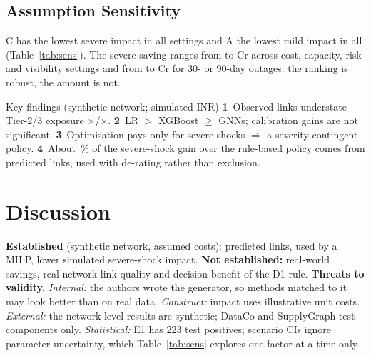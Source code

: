 \documentclass[conference]{IEEEtran}
\begin{document}
\subsection{Assumption Sensitivity}
C has the lowest severe impact in all \SensN{} settings and A the lowest mild impact in all \SensN{} (Table~\ref{tab:sens}).
The severe saving ranges from \SensNdLo{} to \SensNdHi{} Cr across cost, capacity, risk and visibility settings and from \SensLo{} to \SensHi{}
Cr for 30- or 90-day outages: the ranking is robust, the amount is not.

\begin{findings}{Key findings (synthetic network; simulated INR)}
\textbf{1}~Observed links understate Tier-2/3 exposure \GapTwo$\times$/\GapThree$\times$. \textbf{2}~LR $>$ XGBoost $\ge$ GNNs; calibration
gains are not significant. \textbf{3}~Optimisation pays only for severe shocks $\Rightarrow$ a severity-contingent policy. \textbf{4}~About
\AblLinkShare\,\% of the severe-shock gain over the rule-based policy comes from predicted links, used with de-rating rather than exclusion.
\end{findings}


\section{Discussion}
\textbf{Established} (synthetic network, assumed costs): predicted links, used by a MILP, lower simulated severe-shock impact.
\textbf{Not established:} real-world savings, real-network link quality and decision benefit of the D1 rule. \textbf{Threats to validity.} \emph{Internal:} the authors wrote the
generator, so methods matched to it may look better than on real data. \emph{Construct:} impact uses illustrative unit costs. \emph{External:} the
network-level results are synthetic; DataCo and SupplyGraph test components only. \emph{Statistical:} E1 has 223 test positives; scenario CIs
ignore parameter uncertainty, which Table~\ref{tab:sens} explores one factor at a time only.
\end{document}
